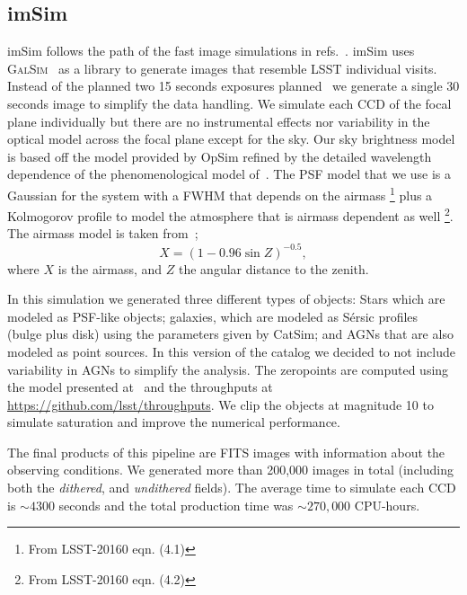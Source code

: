 \documentclass[\docopts]{\docclass}
\begin{document}
\subsection{imSim}
\label{sec:imsim_pipeline}

imSim follows the path of the fast image simulations in refs.~\citep{2016MNRAS.457..786S,2016ApJ...817...25B}.
imSim uses \textsc{GalSim}~\citep{2015A&C....10..121R} as a library to generate images that resemble LSST individual visits. Instead of the
planned two 15 seconds exposures planned~\citep{2008arXiv0805.2366I} we generate a single 30 seconds image to simplify the data handling.
We simulate each CCD of the focal plane individually but there are no instrumental effects nor variability in the optical model
across the focal plane except for the sky.  Our sky brightness model is based off the \citet{1991PASP..103.1033K} model provided by OpSim refined by the detailed wavelength dependence of the phenomenological model of~\citet{2016SPIE.9910E..1AY}. The PSF model that we use is a Gaussian for the system with a FWHM that depends on the airmass
\footnote{From LSST-20160 eqn. (4.1)} plus a Kolmogorov profile to model the atmosphere that is airmass dependent as well
\footnote{From LSST-20160 eqn. (4.2)}. The airmass model is taken from~\citep{1991PASP..103.1033K};
\begin{equation}
X = (1 - 0.96\sin{Z})^{-0.5},
\end{equation}
where $X$ is the airmass, and $Z$ the angular distance to the zenith.

In this simulation we generated three different types of objects: Stars which are modeled as PSF-like objects; galaxies, which are modeled as S\'{e}rsic profiles~\citep{1963BAAA....6...41S} (bulge plus disk) using
the parameters given by CatSim; and AGNs that are also modeled as point sources. In this version of the catalog we decided
to not include variability in AGNs to simplify the analysis. The zeropoints are computed using the model presented at~\citep{2008arXiv0805.2366I} and the
throughputs at \url{https://github.com/lsst/throughputs}. We clip the objects at magnitude 10 to simulate saturation and improve the numerical performance.

The final products of this pipeline are FITS images with information about the observing conditions. We generated more than 200,000 images in total (including both the \textit{dithered}, and \textit{undithered} fields). The average time to simulate each CCD is $\sim 4300$ seconds and the total production time was $\sim 270,000$ CPU-hours.
\end{document}
